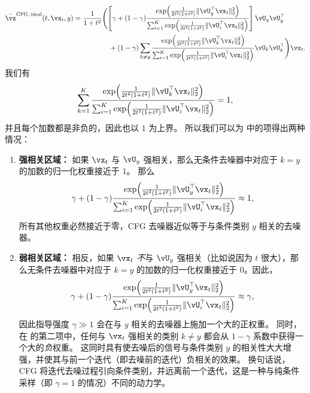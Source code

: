\documentclass[../../book-main_zh.tex]{subfiles}
\begin{document}
\begin{example}
\begin{equation}
    \begin{split}
      \bar{\vx}^{\mathrm{CFG,\,ideal}}(t, \vx_t, y)
      =
      \frac{1}{1 + t^{2}}
      &\Biggl(
      \left[\gamma + (1 - \gamma) 
      \frac{\exp\rp{\frac{1}{2t^{2}(1
      + t^{2})}\norm{\vU_{y}^{\top}\vx_t}_{2}^{2}}}{\sum_{i
      = 1}^{K}\exp\rp{\frac{1}{2t^{2}(1
      + t^{2})}\norm{\vU_{i}^{\top}\vx_t}_{2}^{2}}}
      \right]
      \vU_{y}\vU_{y}^{\top}
      \\
      &\quad+
      (1 - \gamma) 
      \sum_{k \neq y}\frac{\exp\rp{\frac{1}{2t^{2}(1
      + t^{2})}\norm{\vU_{k}^{\top}\vx_t}_{2}^{2}}}{\sum_{i
      = 1}^{K}\exp\rp{\frac{1}{2t^{2}(1
      + t^{2})}\norm{\vU_{i}^{\top}\vx_t}_{2}^{2}}}\vU_{k}\vU_{k}^{\top}
      \Biggr)
      \vx_t.
    \end{split}
  \end{equation}
  我们有
  \begin{equation}
    \sum_{k=1}^K
    \frac{\exp\rp{\frac{1}{2t^{2}(1
    + t^{2})}\norm{\vU_{k}^{\top}\vx_t}_{2}^{2}}}{\sum_{i
    = 1}^{K}\exp\rp{\frac{1}{2t^{2}(1
    + t^{2})}\norm{\vU_{i}^{\top}\vx_t}_{2}^{2}}}
    = 1,
  \end{equation}
  并且每个加数都是非负的，因此也以 $1$ 为上界。
  所以我们可以为  中的项得出两种情况：
  \begin{enumerate}
    \item \textbf{强相关区域：} 如果 $\vx_t$ 与 $\vU_y$ 强相关，那么无条件去噪器中对应于 $k=y$ 的加数的归一化权重接近于 $1$。
      那么
      \begin{equation}
        \gamma + (1 - \gamma) 
      \frac{\exp\rp{\frac{1}{2t^{2}(1
      + t^{2})}\norm{\vU_{y}^{\top}\vx_t}_{2}^{2}}}{\sum_{i
      = 1}^{K}\exp\rp{\frac{1}{2t^{2}(1
      + t^{2})}\norm{\vU_{i}^{\top}\vx_t}_{2}^{2}}}
        \approx 1,
      \end{equation}
      所有其他权重必然接近于零，CFG 去噪器近似等于与条件类别 $y$ 相关的去噪器。
    \item \textbf{弱相关区域：} 相反，如果 $\vx_t$ \textit{不}与 $\vU_y$ 强相关（比如说因为 $t$ 很大），那么无条件去噪器中对应于 $k=y$ 的加数的归一化权重接近于 $0$。因此，
      \begin{equation}
        \gamma + (1 - \gamma) 
      \frac{\exp\rp{\frac{1}{2t^{2}(1
      + t^{2})}\norm{\vU_{y}^{\top}\vx_t}_{2}^{2}}}{\sum_{i
      = 1}^{K}\exp\rp{\frac{1}{2t^{2}(1
      + t^{2})}\norm{\vU_{i}^{\top}\vx_t}_{2}^{2}}}
        \approx \gamma,
      \end{equation}
      因此指导强度 $\gamma \gg 1$ 会在与 $y$ 相关的去噪器上施加一个大的正权重。
      同时，在  的第二项中，任何与 $\vx_t$ 强相关的类别 $k \neq y$ 都会从 $1 - \gamma$ 系数中获得一个大的\textit{负}权重。
      这同时具有使去噪后的信号与条件类别 $y$ 的相关性大大增强，并使其与前一个迭代（即去噪前的迭代）负相关的效果。
      换句话说，CFG 将迭代去噪过程引向条件类别，并远离前一个迭代，这是一种与纯条件采样（即 $\gamma = 1$ 的情况）不同的动力学。
  \end{enumerate}


\end{example}
\end{document}
